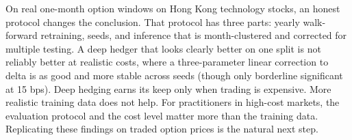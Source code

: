 On \NTest{} real one-month option windows on Hong Kong technology stocks, an honest protocol changes
the conclusion. That protocol has three parts: yearly walk-forward retraining, \NSeeds{} seeds, and
inference that is month-clustered and corrected for multiple testing. A deep hedger that looks clearly
better on one split is not reliably better at realistic costs, where a three-parameter linear correction to delta
is as good and more stable across seeds (though only borderline significant at 15 bps). Deep hedging earns its keep only when trading is expensive. More
realistic training data does not help. For practitioners in high-cost markets, the evaluation protocol
and the cost level matter more than the training data. Replicating these findings on traded option
prices is the natural next step.
